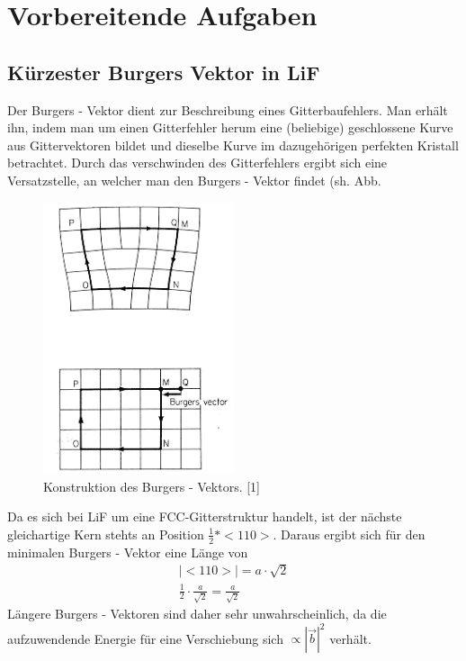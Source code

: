 ﻿\section{Vorbereitende Aufgaben}
    \subsection{Kürzester Burgers Vektor in LiF}
	Der Burgers - Vektor dient zur Beschreibung eines Gitterbaufehlers. Man erhält ihn, indem man um einen Gitterfehler herum eine (beliebige) geschlossene Kurve aus
	Gittervektoren bildet und dieselbe Kurve im dazugehörigen perfekten Kristall betrachtet. Durch das verschwinden des Gitterfehlers ergibt sich eine Versatzstelle,
	an welcher man den Burgers - Vektor findet (sh. Abb. %
	
	\begin{figure}[H]
            \centering
            \includegraphics[width=0.5\textwidth]{Images/Burger.PNG}
            \caption{Konstruktion des Burgers - Vektors. [1]}
            \label{FigBurger}
        \end{figure}

        Da es sich bei LiF um eine FCC-Gitterstruktur handelt, ist der nächste gleichartige Kern stehts an Position $\frac{1}{2} * <110>$. Daraus ergibt sich für den minimalen
        Burgers - Vektor eine Länge von
        \begin{align}
            |<110>| = a \cdot \sqrt{2} \\
            \frac{1}{2} \cdot \frac{a}{\sqrt{2}} = \frac{a}{\sqrt{2}}
        \end{align}
        Längere Burgers - Vektoren sind daher sehr unwahrscheinlich, da die aufzuwendende Energie für eine Verschiebung sich $\propto |\vec{b}|^2$ verhält.


